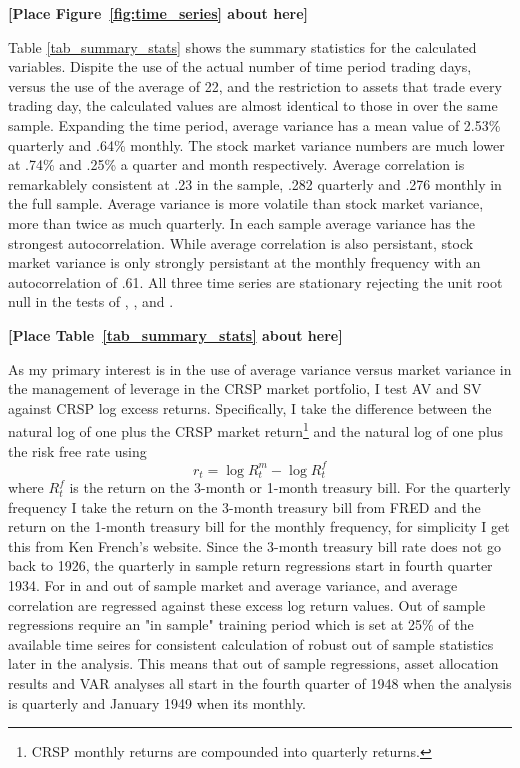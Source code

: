\bigskip
\centerline{\bf [Place Figure~\ref{fig:time_series} about here]}
\bigskip
Table \ref{tab_summary_stats} shows the summary statistics for the calculated variables. Dispite the use of the actual number of time period trading days, versus the use of the average of 22, and the restriction to assets that trade every trading day, the calculated values are almost identical to those in \citet{pollet_average_2010} over the same sample. Expanding the time period, average variance has a mean value of 2.53\% quarterly and .64\% monthly. The stock market variance numbers are much lower at .74\% and .25\% a quarter and month respectively. Average correlation is remarkablely consistent at .23 in the \cite{pollet_average_2010} sample, .282 quarterly and .276 monthly in the full sample. Average variance is more volatile than stock market variance, more than twice as much quarterly. In each sample average variance has the strongest autocorrelation. While average correlation is also persistant, stock market variance is only strongly persistant at the monthly frequency with an autocorrelation of .61. All three time series are stationary rejecting the unit root null in the tests of \citet{dickey_distribution_1979}, \citet{Ng2001}, and \citet{ers1996}.\\
\bigskip
\centerline{\bf [Place Table~\ref{tab_summary_stats} about here]}
\bigskip

As my primary interest is in the use of average variance versus market variance in the management of leverage in the CRSP market portfolio, I test AV and SV against CRSP log excess returns. Specifically, I take the difference between the natural log of one plus the CRSP market return\footnote{CRSP monthly returns are compounded into quarterly returns.} and the natural log of one plus the risk free rate using
\begin{equation}
	r_{t} = \log R^{m}_{t} - \log R^{f}_{t} 
\end{equation}
where $R^{f}_{t}$ is the return on the 3-month or 1-month treasury bill.
For the quarterly frequency I take the return on the 3-month treasury bill from FRED and the return on the 1-month treasury bill for the monthly frequency, for simplicity I get this from Ken French's website. Since the 3-month treasury bill rate does not go back to 1926, the quarterly in sample return regressions start in fourth quarter 1934.  For in and out of sample market and average variance, and average correlation are regressed against these excess log return values. Out of sample regressions require an "in sample" training period which is set at 25\% of the available time seires for consistent calculation of robust out of sample statistics later in the analysis. This means that out of sample regressions, asset allocation results and VAR analyses all start in the fourth quarter of 1948 when the analysis is quarterly and January 1949 when its monthly.